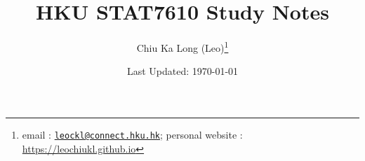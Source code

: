 \documentclass{article}
\begin{document}
\title{HKU STAT7610 Study Notes}
\author{Chiu Ka Long (Leo)\thanks{
email :
\href{mailto:leockl@connect.hku.hk}{\texttt{leockl@connect.hku.hk}};
personal website :
\url{https://leochiukl.github.io}
}}
\date{Last Updated: \today}
\maketitle
\doclicenseThis
\tableofcontents
\nocite{*}




\printbibliography

\end{document}
